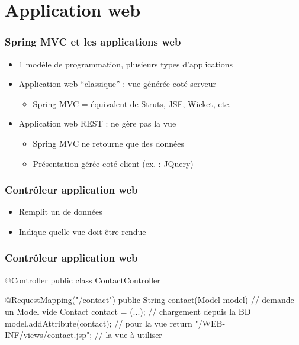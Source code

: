 \section{Application web}


\begin{frame}
 \frametitle{Spring MVC et les applications web}
 \begin{itemize}
  \item 1 modèle de programmation, plusieurs types d'applications
  \item Application web ``classique'' : vue générée coté serveur
   \begin{itemize}
    \item Spring MVC = équivalent de Struts, JSF, Wicket, etc.
   \end{itemize}
  \item Application web REST : ne gère pas la vue
  \begin{itemize}
   \item Spring MVC ne retourne que des données
   \item Présentation gérée coté client (ex. : JQuery)
  \end{itemize}
 \end{itemize}
\end{frame}

\begin{frame}
 \frametitle{Contrôleur application web}
 
 \begin{itemize}
  \item Remplit un  de données
  \item Indique quelle vue doit être rendue
 \end{itemize} 

\end{frame}

\begin{frame}[fragile]
 \frametitle{Contrôleur application web}
 
 \begin{javacode}
@Controller
public class ContactController {

  @RequestMapping("/contact")
  public String contact(Model model) { // demande un Model vide
    Contact contact = (...); // chargement depuis la BD
    model.addAttribute(contact); // pour la vue
    return "/WEB-INF/views/contact.jsp"; // la vue \`a utiliser
  }
  
}
 \end{javacode}

\end{frame}

